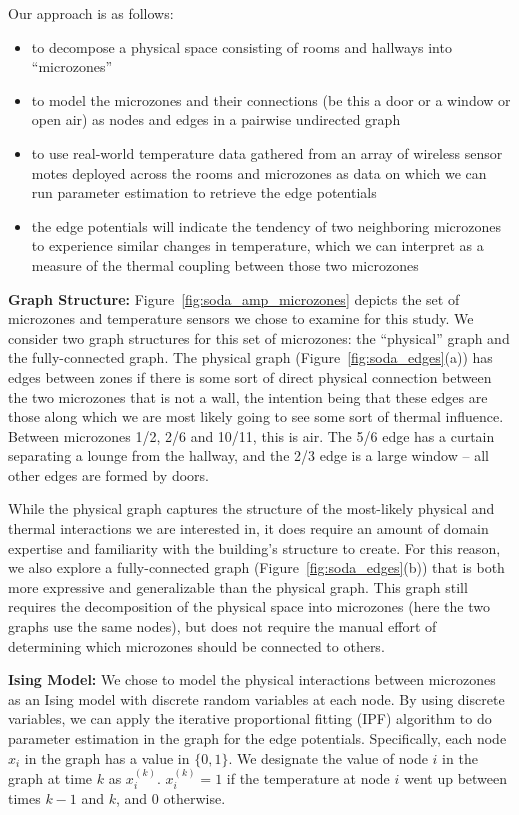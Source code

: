 Our approach is as follows:

\begin{itemize}[noitemsep, nolistsep]
\item to decompose a physical space consisting of rooms and hallways into ``microzones''
\item to model the microzones and their connections (be this a door or a window or open air) as nodes and edges in a pairwise undirected graph
\item to use real-world temperature data gathered from an array of wireless sensor motes deployed across the rooms and microzones as data on which we can run parameter estimation to retrieve the edge potentials
\item the edge potentials will indicate the tendency of two neighboring microzones to experience similar changes in temperature, which we can interpret as a measure of the thermal coupling between those two microzones
\end{itemize}

\textbf{Graph Structure:} Figure~\ref{fig:soda_amp_microzones} depicts the set of microzones and temperature sensors we chose to examine for this study.
We consider two graph structures for this set of microzones: the ``physical'' graph and the fully-connected graph.
The physical graph (Figure~\ref{fig:soda_edges}(a)) has edges between zones if there is some sort of direct physical connection between the two microzones that is not a wall, the intention being that these edges are those along which we are most likely going to see some sort of thermal influence.
Between microzones 1/2, 2/6 and 10/11, this is air. 
The 5/6 edge has a curtain separating a lounge from the hallway, and the 2/3 edge is a large window -- all other edges are formed by doors.

While the physical graph captures the structure of the most-likely physical and thermal interactions we are interested in, it does require an amount of domain expertise and familiarity with the building's structure to create.
For this reason, we also explore a fully-connected graph (Figure~\ref{fig:soda_edges}(b)) that is both more expressive and generalizable than the physical graph.
This graph still requires the decomposition of the physical space into microzones (here the two graphs use the same nodes), but does not require the manual effort of determining which microzones should be connected to others.

\textbf{Ising Model:} We chose to model the physical interactions between microzones as an Ising model with discrete random variables at each node.
By using discrete variables, we can apply the iterative proportional fitting (IPF) algorithm to do parameter estimation in the graph for the edge potentials.
Specifically, each node $x_i$ in the graph has a value in $\lbrace 0, 1\rbrace$.
We designate the value of node $i$ in the graph at time $k$ as $x_i^{(k)}$.
$x_i^{(k)} = 1$ if the temperature at node $i$ went up between times $k-1$  and $k$, and 0 otherwise.

